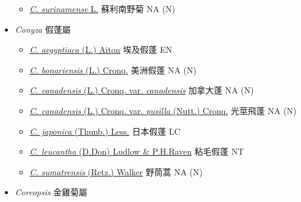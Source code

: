 \begin{itemize}
  \begin{itemize}
        \item[] \href{http://www.theplantlist.org/tpl1.1/search?q=Clibadium+surinamense}{\textit{C. surinamense} L.}   蘇利南野菊   NA (N)
  \end{itemize}
 \item[] \textit{Conyza} 假蓬屬
                                
  \begin{itemize}
        \item[] \href{http://www.theplantlist.org/tpl1.1/search?q=Conyza+aegyptiaca}{\textit{C. aegyptiaca} (L.) Aiton}   埃及假蓬   EN
        \item[] \href{http://www.theplantlist.org/tpl1.1/search?q=Conyza+bonariensis}{\textit{C. bonariensis} (L.) Cronq.}   美洲假蓬   NA (N)
        \item[] \href{http://www.theplantlist.org/tpl1.1/search?q=Conyza+canadensis+var.+canadensis}{\textit{C. canadensis} (L.) Cronq. var. \textit{canadensis}}   加拿大蓬   NA (N)
        \item[] \href{http://www.theplantlist.org/tpl1.1/search?q=Conyza+canadensis+var.+pusilla}{\textit{C. canadensis} (L.) Cronq. var. \textit{pusilla} (Nutt.) Cronq.}   光莖飛蓬   NA (N)
        \item[] \href{http://www.theplantlist.org/tpl1.1/search?q=Conyza+japonica}{\textit{C. japonica} (Thunb.) Less.}   日本假蓬   LC
        \item[] \href{http://www.theplantlist.org/tpl1.1/search?q=Conyza+leucantha}{\textit{C. leucantha} (D.Don) Ludlow \& P.H.Raven}   粘毛假蓬   NT
        \item[] \href{http://www.theplantlist.org/tpl1.1/search?q=Conyza+sumatrensis}{\textit{C. sumatrensis} (Retz.) Walker}   野茼蒿   NA (N)
  \end{itemize}
 \item[] \textit{Coreopsis} 金雞菊屬
                                

\end{itemize}
